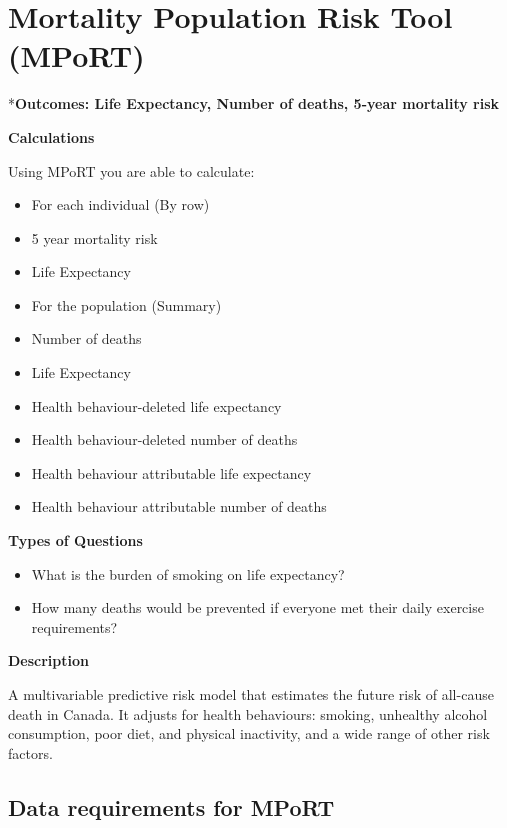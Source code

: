 \documentclass[]{book}
\providecommand{\tightlist}{%
  \setlength{\itemsep}{0pt}\setlength{\parskip}{0pt}}
\begin{document}
\appendix


\hypertarget{mport}{\chapter{Mortality Population Risk Tool
(MPoRT)}\label{mport}}

*\textbf{Outcomes: Life Expectancy, Number of deaths, 5-year mortality
risk}

\textbf{Calculations}

Using MPoRT you are able to calculate:

\begin{itemize}
\item
  For each individual (By row)
\item
  5 year mortality risk
\item
  Life Expectancy
\item
  For the population (Summary)
\item
  Number of deaths
\item
  Life Expectancy
\item
  Health behaviour-deleted life expectancy
\item
  Health behaviour-deleted number of deaths
\item
  Health behaviour attributable life expectancy
\item
  Health behaviour attributable number of deaths
\end{itemize}

\textbf{Types of Questions}

\begin{itemize}
\tightlist
\item
  What is the burden of smoking on life expectancy?
\item
  How many deaths would be prevented if everyone met their daily
  exercise requirements?
\end{itemize}

\textbf{Description}

A multivariable predictive risk model that estimates the future risk of
all-cause death in Canada. It adjusts for health behaviours: smoking,
unhealthy alcohol consumption, poor diet, and physical inactivity, and a
wide range of other risk factors.

\section{Data requirements for MPoRT}\label{data-requirements-for-mport}
\end{document}

